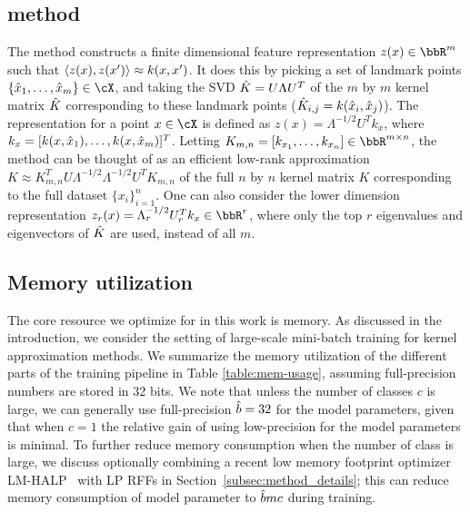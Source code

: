 \subsection{\Nystrom method}
The \Nystrom method constructs a finite dimensional feature representation
$z(x) \in \RR^m$ such that $\left\langle z(x),z(x')\right\rangle \approx k(x,x')$.  It does this
by picking a set of landmark points $\{\hx_1,\ldots,\hx_m\} \in \cX$,
and taking the SVD $\hat{K} = U\Lambda U^T$ of the $m$ by $m$ 
kernel matrix $\hat{K}$ corresponding to these landmark points 
($\hat{K}_{i,j} = k(\hat{x}_i,\hat{x}_j)$).  The \Nystrom representation for a point $x \in \cX$
is defined as $z(x) = \Lambda^{-1/2} U^T k_x$, where $k_x = [k(x,\hat{x}_1),\ldots,k(x,\hat{x}_m)]^T$.
Letting $K_{m,n} = [k_{x_1},\ldots,k_{x_n}] \in \RR^{m\times n}$, 
the \Nystrom method can be thought of as an efficient low-rank approximation
$K \approx K_{m,n}^T U \Lambda^{-1/2}\Lambda^{-1/2} U^T K_{m,n}$ of the full
$n$ by $n$ kernel matrix $K$ corresponding to the full dataset $\{x_i\}_{i=1}^n$.
One can also consider the lower dimension \Nystrom representation
$z_r(x) = \Lambda_r^{-1/2} U_r^T k_x \in \RR^r$, where only the top $r$ eigenvalues and
eigenvectors of $\hat{K}$ are used, instead of all $m$.

\subsection{Memory utilization}
\label{subsec:memory_utils}
The core resource we optimize for in this work is memory.  As discussed in the introduction, we consider the setting of large-scale mini-batch training for kernel approximation methods.  We summarize the memory utilization of the different parts of the training pipeline in Table \ref{table:mem-usage}, assuming full-precision numbers are stored in 32 bits. We note that unless the number of classes $c$ is large, we can generally use full-precision $\hat{b} = 32$ for the model parameters, given that when $c=1$ the relative gain of using low-precision for the model parameters is minimal. To further reduce memory consumption when the number of class is large, we discuss optionally combining a recent low memory footprint optimizer LM-HALP~\cite{halp18} with LP RFFs in Section~\ref{subsec:method_details}; this can reduce memory consumption of model parameter to $\hat{b} mc$ during training.

